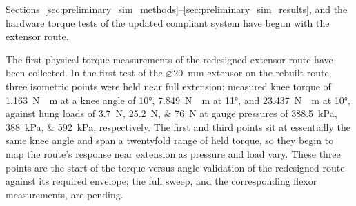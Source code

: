 Sections~\ref{sec:preliminary_sim_methods}--\ref{sec:preliminary_sim_results}, and the hardware torque tests of the updated compliant system have begun with the extensor route.

The first physical torque measurements of the redesigned extensor route have been collected. In the first test of the $\diameter$\qty{20}{\mm} extensor on the rebuilt route, three isometric points were held near full extension: measured knee torque of \qty{1.163}{\newton\cdot\meter} at a knee angle of \ang{10}, \qty{7.849}{\newton\cdot\meter} at \ang{11}, and \qty{23.437}{\newton\cdot\meter} at \ang{10}, against hung loads of \qtylist{3.7;25.2;76}{\newton} at gauge pressures of \qtylist{388.5;388;592}{\kPa}, respectively. The first and third points sit at essentially the same knee angle and span a twentyfold range of held torque, so they begin to map the route's response near extension as pressure and load vary. These three points are the start of the torque-versus-angle validation of the redesigned route against its required envelope; the full sweep, and the corresponding flexor measurements, are pending.


